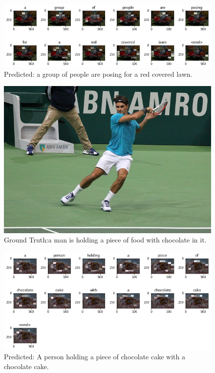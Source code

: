 \begin{figure}[b!]
    \centering
    \includegraphics[width=15cm]{images/ch5/example3-attention.png}
    \caption{Predicted: a group of people are posing for a red covered lawn.}
    \label{fig:example3-att}
\end{figure}


\begin{figure}[t!]
    \centering
    \includegraphics[width=13cm]{images/ch5/example1.png}
    \caption{Ground Truth:a man is holding a piece of food with chocolate in it.}
    \label{fig:example4}
\end{figure}

\begin{figure}[b!]
    \centering
    \includegraphics[width=15cm]{images/ch5/example4-attention.png}
    \caption{Predicted: A person holding a piece of chocolate cake with a chocolate cake.}
    \label{fig:example4-att}
\end{figure}
